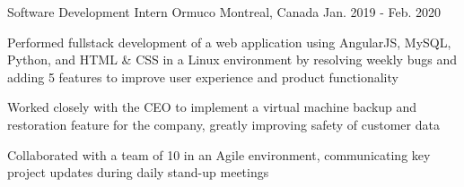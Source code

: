 \begin{cventries}
  \cventry
    {Software Development Intern} %
    {Ormuco} %
    {Montreal, Canada} %
    {Jan. 2019 - Feb. 2020} %
    {
      \begin{cvitems} %
        \item {Performed full\-stack development of a web application using AngularJS, MySQL, Python, and HTML \& CSS in a Linux environment by resolving weekly bugs and adding 5\+ features to improve user experience and product functionality}
        \item {Worked closely with the CEO to implement a virtual machine backup and restoration feature for the company, greatly improving safety of customer data}
        \item {Collaborated with a team of 10 in an Agile environment, communicating key project updates during daily stand-up meetings}
      \end{cvitems}
    }

\end{cventries}
